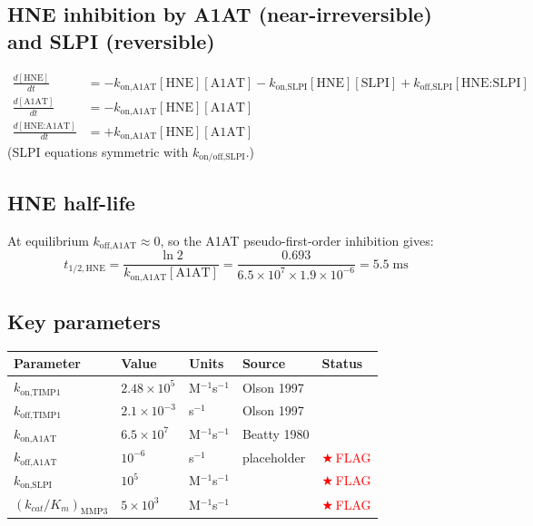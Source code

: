 \documentclass[10pt,a4paper]{article}
\numberwithin{equation}{section}
\newcommand{\FLAG}{\textcolor{red}{$\bigstar$\,FLAG}}
\newcommand{\CONF}{\textcolor{teal}{\checkmark}}
\begin{document}
\subsection{HNE inhibition by A1AT (near-irreversible) and SLPI (reversible)}

\begin{align}
  \frac{d[\text{HNE}]}{dt} &=
    -k_{\text{on,A1AT}}[\text{HNE}][\text{A1AT}]
    -k_{\text{on,SLPI}}[\text{HNE}][\text{SLPI}]
    +k_{\text{off,SLPI}}[\text{HNE:SLPI}] \\
  \frac{d[\text{A1AT}]}{dt} &= -k_{\text{on,A1AT}}[\text{HNE}][\text{A1AT}] \\
  \frac{d[\text{HNE:A1AT}]}{dt} &= +k_{\text{on,A1AT}}[\text{HNE}][\text{A1AT}]
\end{align}
(SLPI equations symmetric with $k_{\text{on/off,SLPI}}$.)

\subsection{HNE half-life}

At equilibrium $k_{\text{off,A1AT}} \approx 0$, so the A1AT pseudo-first-order
inhibition gives:
\begin{equation}
  t_{1/2,\text{HNE}} = \frac{\ln 2}{k_{\text{on,A1AT}}[\text{A1AT}]}
  = \frac{0.693}{6.5\times10^7 \times 1.9\times10^{-6}}
  = 5.5\;\text{ms}
\end{equation}

\subsection{Key parameters}

\begin{center}\small\renewcommand{\arraystretch}{1.2}
\begin{tabular}{@{}lllll@{}}
\toprule
Parameter & Value & Units & Source & Status \\
\midrule
$k_{\text{on,TIMP1}}$  & $2.48\times10^5$ & M$^{-1}$s$^{-1}$ & Olson 1997 & \CONF \\
$k_{\text{off,TIMP1}}$ & $2.1\times10^{-3}$ & s$^{-1}$ & Olson 1997 & \CONF \\
$k_{\text{on,A1AT}}$   & $6.5\times10^7$  & M$^{-1}$s$^{-1}$ & Beatty 1980 & \CONF \\
$k_{\text{off,A1AT}}$  & $10^{-6}$  & s$^{-1}$ & placeholder & \FLAG \\
$k_{\text{on,SLPI}}$   & $10^5$  & M$^{-1}$s$^{-1}$ & & \FLAG \\
$(k_{cat}/K_m)_{\text{MMP3}}$ & $5\times10^3$ & M$^{-1}$s$^{-1}$ & & \FLAG \\
\bottomrule
\end{tabular}
\end{center}
\end{document}
